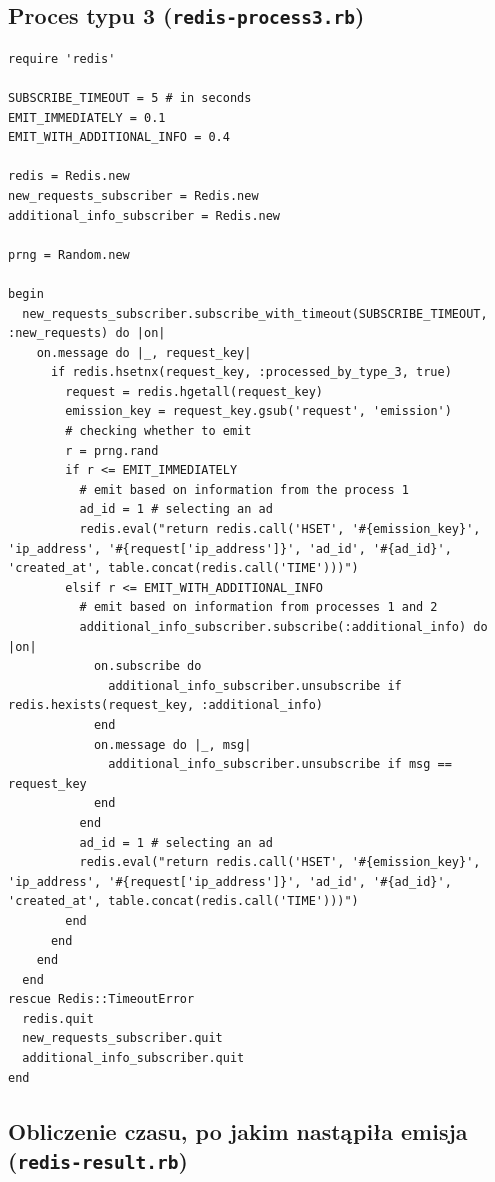 \documentclass[a4paper,11pt]{article}
\begin{document}
\subsection{Proces typu 3 (\texttt{redis-process3.rb})}

\begin{lstlisting}
require 'redis'

SUBSCRIBE_TIMEOUT = 5 # in seconds
EMIT_IMMEDIATELY = 0.1
EMIT_WITH_ADDITIONAL_INFO = 0.4

redis = Redis.new
new_requests_subscriber = Redis.new
additional_info_subscriber = Redis.new

prng = Random.new

begin
  new_requests_subscriber.subscribe_with_timeout(SUBSCRIBE_TIMEOUT, :new_requests) do |on|
    on.message do |_, request_key|
      if redis.hsetnx(request_key, :processed_by_type_3, true)
        request = redis.hgetall(request_key)
        emission_key = request_key.gsub('request', 'emission')
        # checking whether to emit
        r = prng.rand
        if r <= EMIT_IMMEDIATELY
          # emit based on information from the process 1
          ad_id = 1 # selecting an ad
          redis.eval("return redis.call('HSET', '#{emission_key}', 'ip_address', '#{request['ip_address']}', 'ad_id', '#{ad_id}', 'created_at', table.concat(redis.call('TIME')))")
        elsif r <= EMIT_WITH_ADDITIONAL_INFO
          # emit based on information from processes 1 and 2
          additional_info_subscriber.subscribe(:additional_info) do |on|
            on.subscribe do
              additional_info_subscriber.unsubscribe if redis.hexists(request_key, :additional_info)
            end
            on.message do |_, msg|
              additional_info_subscriber.unsubscribe if msg == request_key
            end
          end
          ad_id = 1 # selecting an ad
          redis.eval("return redis.call('HSET', '#{emission_key}', 'ip_address', '#{request['ip_address']}', 'ad_id', '#{ad_id}', 'created_at', table.concat(redis.call('TIME')))")
        end
      end
    end
  end
rescue Redis::TimeoutError
  redis.quit
  new_requests_subscriber.quit
  additional_info_subscriber.quit
end
\end{lstlisting}


\subsection{Obliczenie czasu, po jakim nastąpiła emisja (\texttt{redis-result.rb})}
\end{document}
